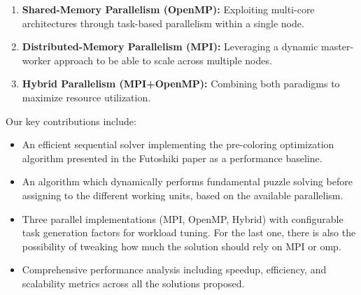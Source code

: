 \begin{enumerate}
    \item \textbf{Shared-Memory Parallelism (OpenMP):} \cite{OpenMP2020} Exploiting multi-core architectures through task-based parallelism within a single node.
    \item \textbf{Distributed-Memory Parallelism (MPI):} \cite{MPIForum2021} Leveraging a dynamic master-worker approach to be able to scale across multiple nodes.
    \item \textbf{Hybrid Parallelism (MPI+OpenMP):} Combining both paradigms to maximize resource utilization.
\end{enumerate}

Our key contributions include:
\begin{itemize}
    \item An efficient sequential solver implementing the pre-coloring optimization algorithm presented in the Futoshiki paper as a performance baseline.
    \item An algorithm which dynamically performs fundamental puzzle solving before assigning to the different working units, based on the available parallelism. 
    \item Three parallel implementations (MPI, OpenMP, Hybrid) with configurable task generation factors for workload tuning. For the last one, there is also the possibility of tweaking how much the solution should rely on MPI or omp.
    \item Comprehensive performance analysis including speedup, efficiency, and scalability metrics across all the solutions proposed.
\end{itemize}